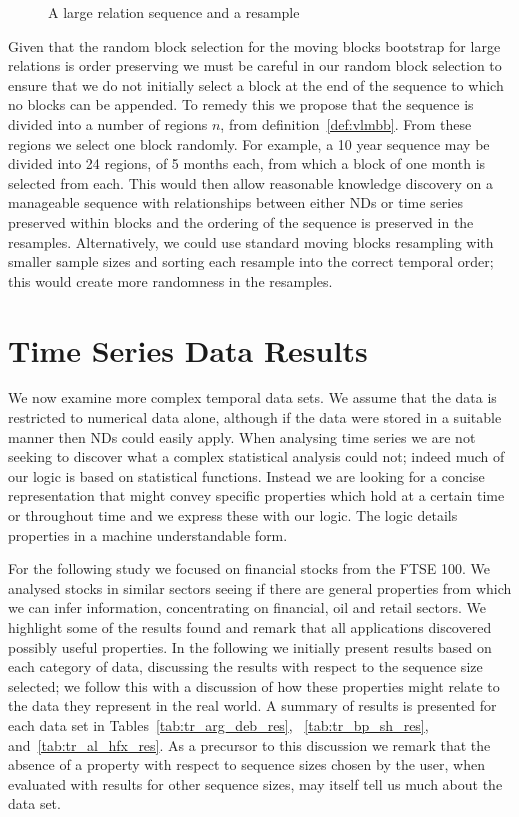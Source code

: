 \smallskip

\begin{figure}[ht]
\centerline{}
\caption{\label{fig:vlmbb}A large relation sequence and a resample}
\end{figure}

Given that the random block selection for the moving blocks bootstrap
for large relations is order preserving we must be careful in our
random block selection to ensure that we do not initially select a
block at the end of the sequence to which no blocks can be
appended. To remedy this we propose that the sequence is divided into
a number of regions $n$, from definition~\ref{def:vlmbb}. From these
regions we select one block randomly. For example, a 10 year sequence
may be divided into 24 regions, of 5 months each, from which a block
of one month is selected from each. This would then allow reasonable
knowledge discovery on a manageable sequence with relationships
between either NDs or time series preserved within blocks and the
 ordering of the sequence is preserved in the
resamples. Alternatively, we could use standard moving blocks
resampling with smaller sample sizes and sorting each resample into
the correct temporal order; this would create more randomness in the
resamples. 

\section{Time Series Data Results}\label{sec:tr_tsares}


We now examine more complex temporal data sets. We 
assume that the data is restricted to numerical data alone, although
if the data were stored in a suitable manner then NDs
could easily apply. When analysing time series we are not seeking to
discover what a complex statistical analysis could not; indeed much of
our logic is based on statistical functions. Instead we are looking
for a concise representation that might convey specific properties
which hold at a certain time or throughout time and we express these
with our logic. The logic details properties in a machine
understandable form. 


\medskip

For the following study we focused on financial stocks from the FTSE
100. We analysed stocks in similar sectors seeing if there are general
properties from which we can infer information, concentrating on
financial, oil and retail sectors. We highlight some of the results
found and remark that all applications discovered possibly useful
properties. In the following we initially present results based on each category
of data, discussing the results with respect to the sequence size
selected; we follow this with a discussion of how these properties
might relate to the data they represent in the real world. A summary
of results is presented for each data set in
Tables~\ref{tab:tr_arg_deb_res}, ~\ref{tab:tr_bp_sh_res},
and~\ref{tab:tr_al_hfx_res}. As a precursor to this discussion we
remark that the absence of a property with respect to sequence sizes
chosen by the user, when evaluated with results for other sequence
sizes, may itself tell us much about the data set.

